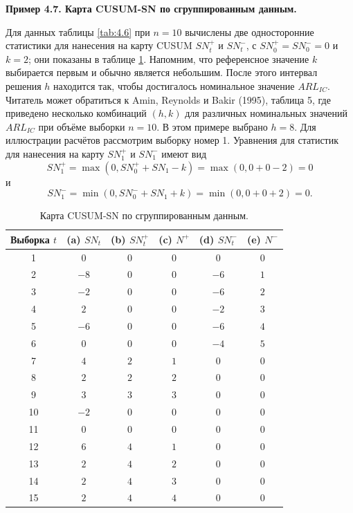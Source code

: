 \noindent\textbf{Пример 4.7. Карта CUSUM-SN по сгруппированным данным.}

Для данных таблицы \ref{tab:4.6} при \(n = 10\) вычислены две односторонние статистики для нанесения на карту CUSUM \(SN_t^+\) и \(SN_t^-\), с \(SN_0^+ = SN_0^- = 0\) и \(k = 2\); они показаны в таблице \ref{tab:4.9}. Напомним, что референсное значение \(k\) выбирается первым и обычно является небольшим. После этого интервал решения \(h\) находится так, чтобы достигалось номинальное значение \(ARL_{IC}\). Читатель может обратиться к Amin, Reynolds и Bakir (1995), таблица 5, где приведено несколько комбинаций \((h, k)\) для различных номинальных значений \(ARL_{IC}\) при объёме выборки \(n = 10\). В этом примере выбрано \(h = 8\). Для иллюстрации расчётов рассмотрим выборку номер 1. Уравнения для статистик для нанесения на карту \(SN_1^+\) и \(SN_1^-\) имеют вид
\[
	SN_1^+ = \max(0, SN_0^+ + SN_1 - k) = \max(0, 0 + 0 - 2) = 0
\]
и
\[
	SN_1^- = \min(0, SN_0^- + SN_1 + k) = \min(0, 0 + 0 + 2) = 0.
\]

\begin{table}[!ht]
	\centering
	\caption{Карта CUSUM-SN по сгруппированным данным.}
	\label{tab:4.9}
	\begin{tabular}{@{}cccccc@{}}\toprule
		Выборка \(t\) & (a) \(SN_t\) & (b) \(SN_t^+\) & (c) \(N^+\) & (d) \(SN_t^-\) & (e) \(N^-\) \\ \midrule
		1 & \(0\) & \(0\) & \(0\) & \(0\) & \(0\) \\
		2 & \(-8\) & \(0\) & \(0\) & \(-6\) & \(1\) \\
		3 & \(-2\) & \(0\) & \(0\) & \(-6\) & \(2\) \\
		4 & \(2\) & \(0\) & \(0\) & \(-2\) & \(3\) \\
		5 & \(-6\) & \(0\) & \(0\) & \(-6\) & \(4\) \\
		6 & \(0\) & \(0\) & \(0\) & \(-4\) & \(5\) \\
		7 & \(4\) & \(2\) & \(1\) & \(0\) & \(0\) \\
		8 & \(2\) & \(2\) & \(2\) & \(0\) & \(0\) \\
		9 & \(3\) & \(3\) & \(3\) & \(0\) & \(0\) \\
		10 & \(-2\) & \(0\) & \(0\) & \(0\) & \(0\) \\
		11 & \(0\) & \(0\) & \(0\) & \(0\) & \(0\) \\
		12 & \(6\) & \(4\) & \(1\) & \(0\) & \(0\) \\
		13 & \(2\) & \(4\) & \(2\) & \(0\) & \(0\) \\
		14 & \(2\) & \(4\) & \(3\) & \(0\) & \(0\) \\
		15 & \(2\) & \(4\) & \(4\) & \(0\) & \(0\) \\ \bottomrule
	\end{tabular}
\end{table}

